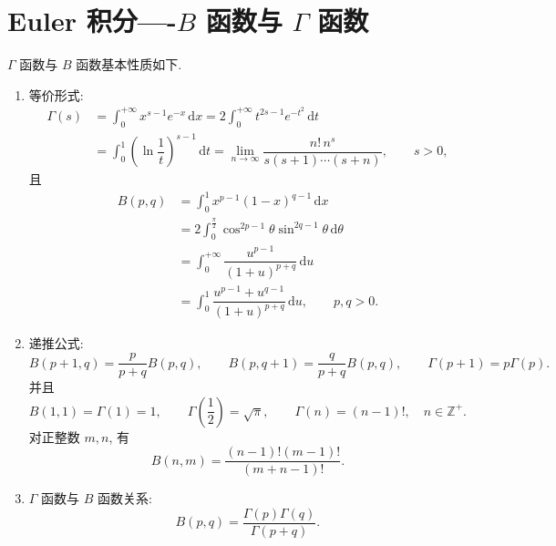 \newpage

\section{\texorpdfstring{Euler 积分----$B$ 函数与 $\Gamma$ 函数}{Euler 积分----B 函数与 Gamma 函数}}

\begin{proposition}[\markstar]
    $\Gamma$ 函数与 $B$ 函数基本性质如下.

    \begin{enumerate}
        \item 等价形式:
              \begin{align*}
                  \Gamma(s)
                   & =\int_0^{+\infty}x^{s-1}e^{-x}\,\mathrm{d}x
                  =2\int_0^{+\infty}t^{2s-1}e^{-t^2}\,\mathrm{d}t             \\
                   & =\int_0^1\left(\ln\dfrac{1}{t}\right)^{s-1}\,\mathrm{d}t
                  =\lim\limits_{n\to\infty}\dfrac{n!\,n^s}{s(s+1)\cdots(s+n)},\qquad s>0,
              \end{align*}
              且
              \begin{align*}
                  B(p,q)
                   & =\int_0^1x^{p-1}(1-x)^{q-1}\,\mathrm{d}x                                     \\
                   & =2\int_0^{\frac{\pi}{2}}\cos^{2p-1}\theta\sin^{2q-1}\theta\,\mathrm{d}\theta \\
                   & =\int_0^{+\infty}\dfrac{u^{p-1}}{(1+u)^{p+q}}\,\mathrm{d}u                   \\
                   & =\int_0^1\dfrac{u^{p-1}+u^{q-1}}{(1+u)^{p+q}}\,\mathrm{d}u,
                  \qquad p,q>0.
              \end{align*}

        \item 递推公式:
              \[
                  B(p+1,q)=\dfrac{p}{p+q}B(p,q),\qquad
                  B(p,q+1)=\dfrac{q}{p+q}B(p,q),\qquad
                  \Gamma(p+1)=p\Gamma(p).
              \]
              并且
              \[
                  B(1,1)=\Gamma(1)=1,\qquad
                  \Gamma\left(\dfrac{1}{2}\right)=\sqrt{\pi},\qquad
                  \Gamma(n)=(n-1)!,\quad n\in\mathbb{Z}^+.
              \]
              对正整数 $m,n$, 有
              \[
                  B(n,m)=\dfrac{(n-1)!(m-1)!}{(m+n-1)!}.
              \]

        \item $\Gamma$ 函数与 $B$ 函数关系:
              \[
                  B(p,q)=\dfrac{\Gamma(p)\Gamma(q)}{\Gamma(p+q)}.
              \]


\end{enumerate}
\end{proposition}

